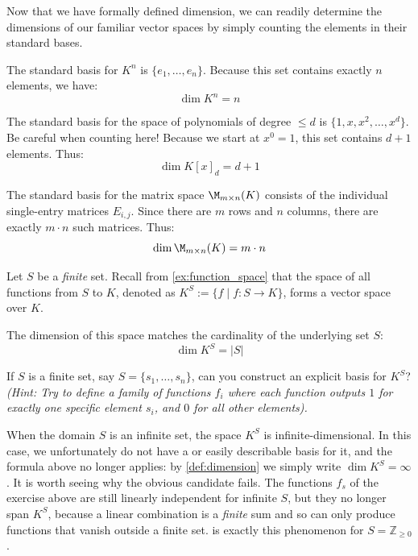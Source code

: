 Now that we have formally defined dimension, we can readily determine the dimensions of our familiar vector spaces by simply counting the elements in their standard bases.

\begin{example}
The standard basis for $K^n$ is $\{e_1, \dots, e_n\}$. Because this set contains exactly $n$ elements, we have:
\[
\dim K^n = n
\]
\end{example}

\begin{example}
The standard basis for the space of polynomials of degree $\le d$ is $\{1, x, x^2, \dots, x^d\}$. Be careful when counting here! Because we start at $x^0 = 1$, this set contains $d+1$ elements. Thus:
\[
\dim K[x]_d = d + 1
\]
\end{example}

\begin{example}[Matrices]
The standard basis for the matrix space $\M_{m \times n}(K)$ consists of the individual single-entry matrices $E_{i,j}$. Since there are $m$ rows and $n$ columns, there are exactly $m \cdot n$ such matrices. Thus:
\[
\dim \M_{m \times n}(K) = m \cdot n
\]
\end{example}

\begin{example}
Let $S$ be a \emph{finite} set. Recall from \cref{ex:function_space} that the space of all functions from $S$ to $K$, denoted as $K^S := \{f \mid f: S \to K\}$, forms a vector space over $K$.

The dimension of this space matches the cardinality of the underlying set $S$:
\[
\dim K^S = |S|
\]

\begin{exercise}
\label{exc:basis_of_function_space}
If $S$ is a finite set, say $S = \{s_1, \dots, s_n\}$, can you construct an explicit basis for $K^S$? \\
\textit{(Hint: Try to define a family of functions $f_i$ where each function outputs $1$ for exactly one specific element $s_i$, and $0$ for all other elements).}
\end{exercise}

\begin{remark}
\label{rem:infinite_function_space}
When the domain $S$ is an infinite set, the space $K^S$ is infinite-di\-men\-sional. In this case, we unfortunately do not have a  or easily describable basis for it, and the formula above no longer applies: by \cref{def:dimension} we simply write $\dim K^S = \infty$. It is worth seeing why the obvious candidate fails. The functions $f_s$ of the exercise above are still linearly independent for infinite $S$, but they no longer span $K^S$, because a linear combination is a \emph{finite} sum and so can only produce functions that vanish outside a finite set.  is exactly this phenomenon for $S = \mathbb{Z}_{\ge 0}$.
\end{remark}
\end{example}

